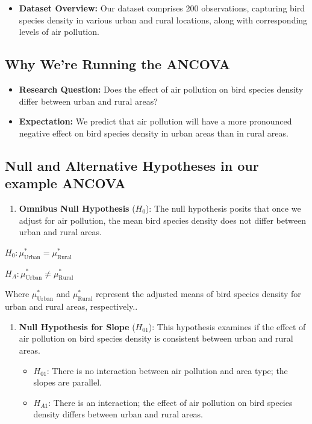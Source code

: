 \documentclass[
  letterpaper,
  DIV=11,
  numbers=noendperiod]{scrreprt}
\providecommand{\tightlist}{%
  \setlength{\itemsep}{0pt}\setlength{\parskip}{0pt}}\usepackage{longtable,booktabs,array}
\begin{document}
\begin{itemize}
\tightlist
\item
  \textbf{Dataset Overview:} Our dataset comprises 200 observations,
  capturing bird species density in various urban and rural locations,
  along with corresponding levels of air pollution.
\end{itemize}

\subsection{Why We're Running the
ANCOVA}\label{why-were-running-the-ancova}

\begin{itemize}
\item
  \textbf{Research Question:} Does the effect of air pollution on bird
  species density differ between urban and rural areas?
\item
  \textbf{Expectation:} We predict that air pollution will have a more
  pronounced negative effect on bird species density in urban areas than
  in rural areas.
\end{itemize}

\subsection{Null and Alternative Hypotheses in our example
ANCOVA}\label{null-and-alternative-hypotheses-in-our-example-ancova}

\begin{enumerate}
\def\labelenumi{\arabic{enumi}.}
\tightlist
\item
  \textbf{Omnibus Null Hypothesis} (\(H_0\)): The null hypothesis posits
  that once we adjust for air pollution, the mean bird species density
  does not differ between urban and rural areas.
\end{enumerate}

\(H_0: \mu^*_{\text{Urban}} = \mu^*_{\text{Rural}}\)

\(H_A: \mu^*_{\text{Urban}} \neq \mu^*_{\text{Rural}}\)

Where \(\mu^*_{\text{Urban}}\) and \(\mu^*_{\text{Rural}}\) represent
the adjusted means of bird species density for urban and rural areas,
respectively..

\begin{enumerate}
\def\labelenumi{\arabic{enumi}.}
\setcounter{enumi}{1}
\item
  \textbf{Null Hypothesis for Slope} (\(H_{01}\)): This hypothesis
  examines if the effect of air pollution on bird species density is
  consistent between urban and rural areas.

  \begin{itemize}
  \tightlist
  \item
    \(H_{01}\): There is no interaction between air pollution and area
    type; the slopes are parallel.
  \item
    \(H_{A1}\): There is an interaction; the effect of air pollution on
    bird species density differs between urban and rural areas.
  \end{itemize}
\end{enumerate}
\end{document}
